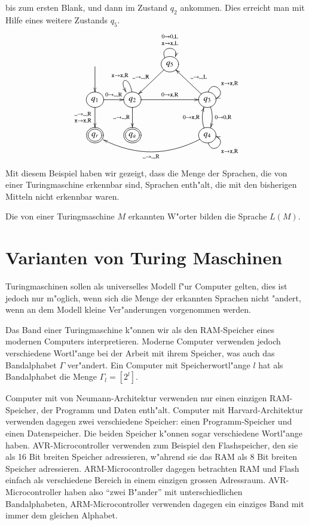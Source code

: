 bis zum ersten Blank, und dann im Zustand $q_2$ ankommen. Dies erreicht
man mit Hilfe eines weitere Zustands $q_5$.
\[
\entrymodifiers={++[o][F]}
\xymatrix{
*+\txt{}\ar[d]
	&*+\txt{}
		&{q_5}\ar@(ul,ur)^{\genfrac{}{}{0pt}{1}{0\to 0,\text{L}}{{\tt x}\to {\tt x},\text{L}}}
		      \ar[dl]_{\blank\to\blank,\text{R}}
\\
{q_1}\ar[d]_{\genfrac{}{}{0pt}{1}{\blank\to\blank,\text{R}}{{\tt x}\to{\tt x},\text{R}}}
	\ar[r]^{0\to\blank,\text{R}}
	&{q_2}\ar[d]_{\blank\to\blank,\text{R}}
	      \ar[rr]^{0\to{\tt x},\text{R}}
              \ar@(u,ul)_{{\tt x}\to {\tt x},\text{R}}
		&*+\txt{}
			&{q_3}\ar@(u,r)^{{\tt x}\to{\tt x},\text{R}}
			      \ar@/^/[d]^{0\to 0,\text{R}}
			      \ar[ul]_{\blank\to\blank,\text{L}}
\\
*++[o][F=]{q_r}
	&*++[o][F=]{q_a}
		&*+\txt{}
			&{q_4}\ar@/^/[u]^{0\to {\tt x},\text{R}}
			      \ar@(d,r)_{{\tt x}\to{\tt x},\text{R}}
			      \ar@/^20pt/[lll]^{\blank\to\blank,\text{R}}
}
\]
Mit diesem Beispiel haben wir gezeigt, dass die Menge der
Sprachen, die von einer Turingmaschine erkennbar sind, Sprachen
enth"alt, die mit den bisherigen Mitteln nicht erkennbar waren.

\begin{definition}
Die von einer Turingmaschine $M$ erkannten W"orter bilden die
Sprache $L(M)$.
\end{definition}

\section{Varianten von Turing Maschinen}
Turingmaschinen sollen als universelles Modell f"ur Computer gelten,
dies ist jedoch nur m"oglich, wenn sich die Menge der erkannten Sprachen
nicht "andert, wenn an dem Modell kleine Ver"anderungen vorgenommen
werden.

Das Band einer Turingmaschine k"onnen wir als den RAM-Speicher
eines modernen Computers interpretieren. Moderne Computer verwenden
jedoch verschiedene Wortl"ange bei der Arbeit mit ihrem Speicher,
was auch das Bandalphabet $\Gamma$ ver"andert. Ein Computer mit
Speicherwortl"ange $l$ hat als Bandalphabet die Menge $\Gamma_l=[2^l]$.

Computer mit von Neumann-Architektur verwenden nur einen einzigen RAM-Speicher,
der Programm und Daten enth"alt. Computer mit Harvard-Architektur
verwenden dagegen zwei verschiedene Speicher: einen Programm-Speicher
und einen Datenspeicher. Die beiden Speicher k"onnen sogar verschiedene
Wortl"ange haben. AVR-Microcontroller verwenden zum Beispiel
den Flashspeicher, den sie als 16 Bit breiten Speicher adressieren,
w"ahrend sie das RAM als 8 Bit breiten Speicher adressieren.
ARM-Microcontroller dagegen betrachten RAM und Flash einfach als
verschiedene Bereich in einem einzigen grossen Adressraum.
AVR-Microcontroller haben also ``zwei B"ander'' mit unterschiedlichen
Bandalphabeten, ARM-Microcontroller verwenden dagegen ein einziges Band
mit immer dem gleichen Alphabet.

